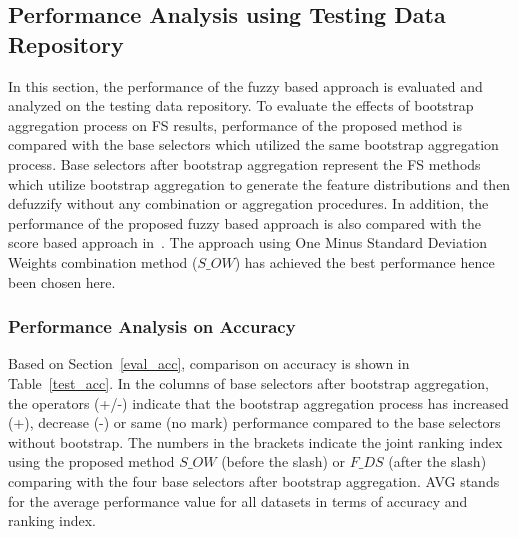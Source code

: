 \documentclass[conference]{IEEEtran}
\begin{document}
\subsection{Performance Analysis using Testing Data Repository}
In this section, the performance of the fuzzy based approach is evaluated and analyzed on the testing data repository. To evaluate the effects of bootstrap aggregation process on FS results, performance of the proposed method is compared with the base selectors which utilized the same bootstrap aggregation process. Base selectors after bootstrap aggregation represent the FS methods which utilize bootstrap aggregation to generate the feature distributions and then defuzzify without any combination or aggregation procedures. In addition, the performance of the proposed fuzzy based approach is also compared with the score based approach in~\cite{shen2019novel}. The approach using One Minus Standard Deviation Weights combination method ($S\_{OW}$) has achieved the best performance hence been chosen here.

\subsubsection{\textbf{Performance Analysis on Accuracy}}
Based on Section~\ref{eval_acc}, comparison on accuracy is shown in Table~\ref{test_acc}. In the columns of base selectors after bootstrap aggregation, the operators (+/-) indicate that the bootstrap aggregation process has increased (+), decrease (-) or same (no mark) performance compared to the base selectors without bootstrap. The numbers in the brackets indicate the joint ranking index using the proposed method $S\_{OW}$ (before the slash) or $F\_{DS}$ (after the slash) comparing with the four base selectors after bootstrap aggregation. AVG stands for the average performance value for all datasets in terms of accuracy and ranking index.
\end{document}
